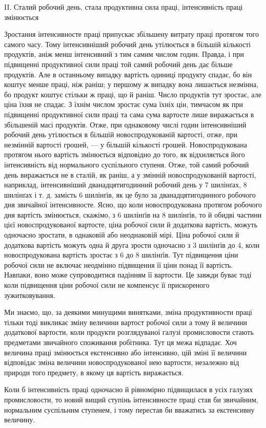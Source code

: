 II. Сталий робочий день, стала продуктивна сила праці,
інтенсивність праці змінюється

Зростання інтенсивносте праці припускає збільшену витрату
праці протягом того самого часу. Тому інтенсивніший робочий
день утілюється в більшій кількості продуктів, аніж менш
інтенсивний з тим самим числом годин. Правда, і при підвищенні
продуктивної сили праці той самий робочий день дає
більше продуктів. Але в останньому випадку вартість одиниці
продукту спадає, бо він коштує менше праці, ніж раніш; у першому
ж випадку вона лишається незмінна, бо продукт коштує
стільки ж праці, що й раніш. Число продуктів тут зростає, але
ціна їхня не спадає. З їхнім числом зростає сума їхніх цін, тимчасом
як при підвищенні продуктивної сили праці та сама сума
вартосте лише виражається в збільшеній масі продуктів. Отже,
при однаковому числі годин інтенсивніший робочий день утілюється
в більшій новоспродукованій вартості, отже, при незмінній
вартості грошей, — у більшій кількості грошей. Новоспродукована
протягом нього вартість змінюється відповідно до того,
як відхиляється його інтенсивність від нормального суспільного
ступеня. Отже, той самий робочий день виражається не в сталій,
як раніш, а у змінній новоспродукованій вартості, наприклад,
інтенсивніший дванадцятигодинний робочий день у 7 шилінґах,
8 шилінґах і т. д. замість 6 шилінґів, як це було за дванадцятигодинного
робочого дня звичайної інтенсивносте. Ясно, що коли
новоспродукована протягом робочого дня вартість змінюється,
скажімо, з 6 шилінґів на 8 шилінґів, то й обидві частини цієї
новоспродукованої вартосте, ціна робочої сили й додаткова вартість,
можуть одночасно зростати, в однаковій або неоднаковій
мірі. Ціна робочої сили й додаткова вартість можуть одна й друга
зрости одночасно з 3 шилінґів до 4, коли новоспродукована вартість
зростає з 6 до 8 шилінґів. Тут підвищення ціни робочої
сили не включає неодмінно підвищення її ціни понад її вартість.
Навпаки, воно може супроводитися падінням її вартости. Це
завжди буває тоді коли підвищення ціни робочої сили не компенсує
її прискореного зужитковування.

Ми знаємо, що, за деякими минущими винятками, зміна
продуктивности праці тільки тоді викликає зміну величини вартост
робочої сили а тому й величини додаткової вартости, коли
продукти розглядуваної галузі промисловости стають предметами
звичайного споживання робітника. Тут ця межа відпадає.
Хоч величина праці змінюється екстенсивно або інтенсивно, цій
зміні її величини відповідає зміна величини новоспродукованої
нею вартости, незалежно від природи того предмету, в якому
ця вартість виражається.

Коли б інтенсивність праці одночасно й рівномірно підвищилася
в усіх галузях промисловости, то новий вищий ступінь інтенсивносте
праці став би звичайним, нормальним суспільним ступенем,
і тому перестав би вважатись за екстенсивну величину.
\parbreak{}  %
